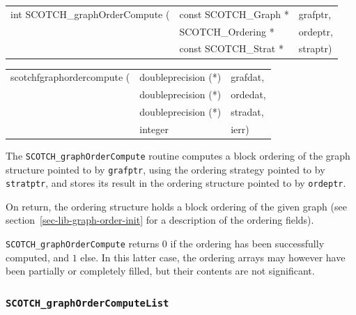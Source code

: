 \begin{itemize}
\progsyn

{\tt\begin{tabular}{l@{}ll}
int SCOTCH\_graphOrderCompute ( & const SCOTCH\_Graph * & grafptr, \\
                                & SCOTCH\_Ordering *    & ordeptr, \\
                                & const SCOTCH\_Strat * & straptr)
\end{tabular}}

{\tt\begin{tabular}{l@{}ll}
scotchfgraphordercompute ( & doubleprecision (*) & grafdat, \\
                           & doubleprecision (*) & ordedat, \\
                           & doubleprecision (*) & stradat, \\
                           & integer             & ierr)
\end{tabular}}

\progdes

The {\tt SCOTCH\_graphOrderCompute} routine computes a block ordering
of the graph structure pointed to by {\tt grafptr}, using the ordering
strategy pointed to by {\tt stratptr}, and stores its result in the
ordering structure pointed to by {\tt ordeptr}.

On return, the ordering structure holds a block ordering of the
given graph (see section~\ref{sec-lib-graph-order-init} for a
description of the ordering fields).

\progret

{\tt SCOTCH\_graphOrderCompute} returns $0$ if the ordering has been
successfully computed, and $1$ else. In this latter case, the ordering
arrays may however have been partially or completely filled, but their
contents are not significant.
\end{itemize}

\subsubsection{{\tt SCOTCH\_graphOrderComputeList}}
\label{sec-lib-graph-order-compute-list}


